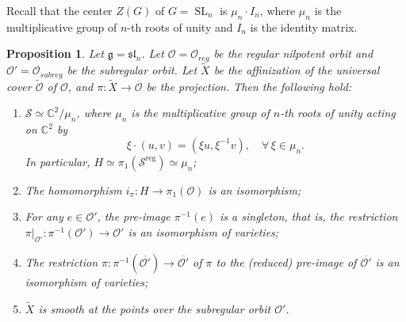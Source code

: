 \documentclass{amsart}
\newtheorem{proposition}[theorem]{Proposition}
\theoremstyle{definition}
\DeclareMathOperator{\reg}{reg}
\DeclareMathOperator{\SL}{SL}
\newcommand{\C}{\mathbb{C}}
\newcommand{\cS}{\mathcal{S}}
\newcommand{\g}{\mathfrak{g}}
\newcommand{\0}{\mathcal{O}}
\begin{document}
Recall that the center $Z(G)$ of $G=\SL_n$ is $\mu_n \cdot I_n$, where $\mu_n$ is the multiplicative group of $n$-th roots of unity and $I_n$ is the identity matrix.

\begin{proposition} \label{prop:typeA_fundamental}
	Let $\g = \mathfrak{sl}_n$.  Let $\0 = \0_{reg}$ be the regular nilpotent orbit and $\0' = \0_{subreg}$ be the subregular orbit. Let $\widetilde{X}$ be the affinization of the universal cover $\widetilde{\0}$ of $\0$, and $\pi: \widetilde{X} \to \overline{\0}$ be the projection. Then the following hold:

	\begin{enumerate}
		\item $\cS \simeq \C^2/\mu_n$, where $\mu_n$ is the multiplicative group of $n$-th roots of unity acting on $\C^2$ by 
			\[ \xi \cdot (u,v) = (\xi u,\xi^{-1}v), \quad \forall\, \xi \in \mu_n.\]
		In particular, $H \simeq \pi_1(\cS^{\reg}) \simeq\mu_n$;  
		\item The homomorphism $i_\pi: H \to \pi_1(\0)$ is an isomorphism;
		\item For any $e \in \0'$, the pre-image $\pi^{-1}(e)$ is a singleton, that is, the restriction $\pi|_{\0'}: \pi^{-1}(\0') \to \0'$ is an isomorphism of varieties;
		\item The restriction $\pi: \pi^{-1}(\overline{\0'}) \to \overline{\0'}$ of $\pi$ to the (reduced) pre-image of $\overline{\0'}$ is an isomorphism of varieties;
		\item $\widetilde{X}$ is smooth at the points over the subregular orbit $\0'$.
	\end{enumerate}
\end{proposition}
\end{document}
